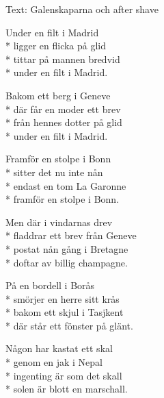 \begin{SongText}
    \begin{SongInfo}
        Text: Galenskaparna och after shave
    \end{SongInfo}
    \begin{SongVerse}
        Under en filt i Madrid\\*%
        ligger en flicka på glid\\*%
        tittar på mannen bredvid\\*%
        under en filt i Madrid.
    \end{SongVerse}
    \begin{SongVerse}
        Bakom ett berg i Geneve\\*%
        där får en moder ett brev\\*%
        från hennes dotter på glid\\*%
        under en filt i Madrid.
    \end{SongVerse}
    \begin{SongVerse}
        Framför en stolpe i Bonn\\*%
        sitter det nu inte nån\\*%
        endast en tom La Garonne\\*%
        framför en stolpe i Bonn.
    \end{SongVerse}
    \begin{SongVerse}
        Men där i vindarnas drev\\*%
        fladdrar ett brev från Geneve\\*%
        postat nån gång i Bretagne\\*%
        doftar av billig champagne.
    \end{SongVerse}
    \begin{SongVerse}
        På en bordell i Borås\\*%
        smörjer en herre sitt krås\\*%
        bakom ett skjul i Tasjkent\\*%
        där står ett fönster på glänt.
    \end{SongVerse}
    \begin{SongVerse}
        Någon har kastat ett skal\\*%
        genom en jak i Nepal\\*%
        ingenting är som det skall\\*%
        solen är blott en marschall.
    \end{SongVerse}
    \begin{SongVerse}

\end{SongVerse}
\end{SongText}
